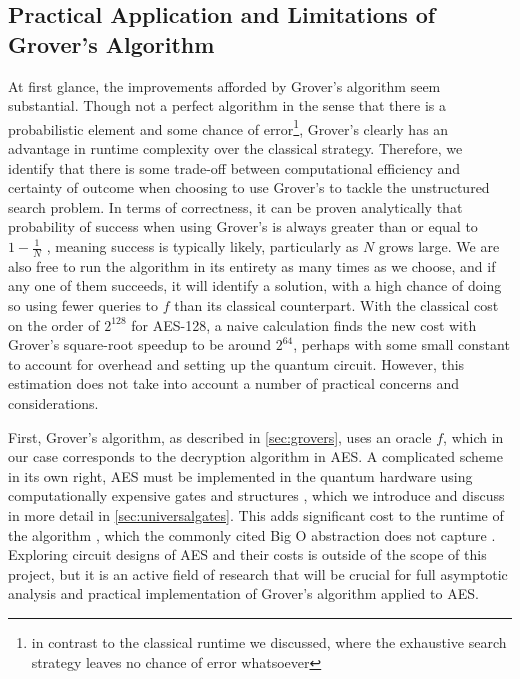 \subsection{Practical Application and Limitations of Grover's Algorithm}
At first glance, the improvements afforded by Grover's algorithm seem substantial. Though not a perfect algorithm in the sense that there is a probabilistic element and some chance of error\footnote{in contrast to the classical runtime we discussed, where the exhaustive search strategy leaves no chance of error whatsoever}, Grover's clearly has an advantage in runtime complexity over the classical strategy. Therefore, we identify that there is some trade-off between computational efficiency and certainty of outcome when choosing to use Grover's to tackle the unstructured search problem. In terms of correctness, it can be proven analytically that probability of success when using Grover's is always greater than or equal to $1 - \frac{1}{N}$ \cite{Qiskit2023}, meaning success is typically likely, particularly as $N$ grows large. We are also free to run the algorithm in its entirety as many times as we choose, and if any one of them succeeds, it will identify a solution, with a high chance of doing so using fewer queries to $f$ than its classical counterpart. With the classical cost on the order of $2^{128}$ for AES-128, a naive calculation finds the new cost with Grover's square-root speedup to be around $2^{64}$, perhaps with some small constant to account for overhead and setting up the quantum circuit. However, this estimation does not take into account a number of practical concerns and considerations.

First, Grover's algorithm, as described in \cref{sec:grovers}, uses an oracle $f$, which in our case corresponds to the decryption algorithm in AES. A complicated scheme in its own right, AES must be implemented in the quantum hardware using computationally expensive gates and structures \cite{jaques2024ches_presentation,chen2025quantumcircuitimplementingaes}, which we introduce and discuss in more detail in \cref{sec:universalgates}. This adds significant cost to the runtime of the algorithm \cite{jaques2024ches_presentation}, which the commonly cited Big O abstraction does not capture \cite{bigO}. Exploring circuit designs of AES and their costs is outside of the scope of this project, but it is an active field of research \cite{resourcefficientAES,cryptoeprint,chen2025quantumcircuitimplementingaes}
that will be crucial for full asymptotic analysis and practical implementation of Grover's algorithm applied to AES.

